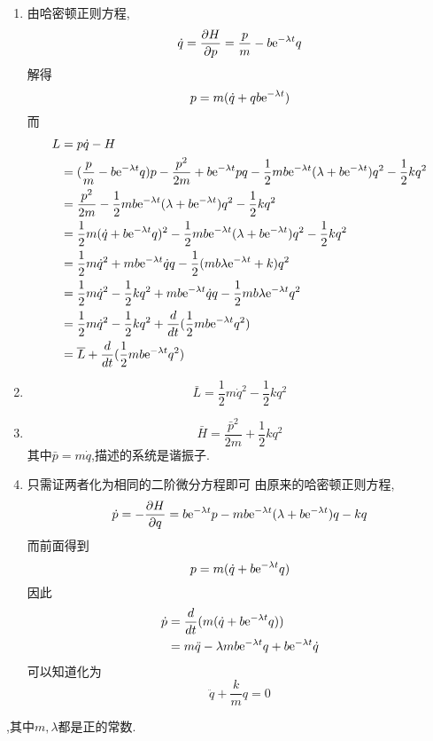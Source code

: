\begin{solution}
    \begin{enumerate}[label=(\arabic*)]
        \item 由哈密顿正则方程,
        $$\dot q=\frac{\partial H}{\partial p}=\frac pm-b\mathrm e^{-\lambda t}q$$
        解得
        $$p=m(\dot q+qb\mathrm e^{-\lambda t})$$
        而
        \begin{align*}
            L&=p\dot q-H\\
             &=(\frac pm-b\mathrm e^{-\lambda t}q)p-\frac{p^2}{2m}+b\mathrm e^{-\lambda t}pq-\frac12mb\mathrm e^{-\lambda t}(\lambda+b\mathrm e^{-\lambda t})q^2-\frac12 kq^2\\
             &=\frac{p^2}{2m}-\frac12mb\mathrm e^{-\lambda t}(\lambda+b\mathrm e^{-\lambda t})q^2-\frac12 kq^2\\
             &=\frac12m(\dot q+b\mathrm e^{-\lambda t}q)^2-\frac12mb\mathrm e^{-\lambda t}(\lambda+b\mathrm e^{-\lambda t})q^2-\frac12 kq^2\\
             &=\frac12m\dot q^2+mb\mathrm e^{-\lambda t}\dot q q-\frac12(mb\lambda\mathrm e^{-\lambda t}+k)q^2\\
             &=\frac12m\dot q^2-\frac12kq^2+mb\mathrm e^{-\lambda t}\dot q q-\frac12mb\lambda\mathrm e^{-\lambda t}q^2\\
             &=\frac12m\dot q^2-\frac12kq^2+\frac{d}{dt}(\frac12 mb\mathrm e^{-\lambda t}q^2)\\
             &=\overline{L}+\frac{d}{dt}(\frac12 mb\mathrm e^{-\lambda t}q^2)
        \end{align*}
    \item $$\bar{L}=\frac12m\dot q^2-\frac12kq^2$$
    \item $$\bar{H}=\frac{\bar{p}^2}{2m}+\frac12kq^2$$
    其中$\bar{p}=m\dot q$,描述的系统是谐振子.
    \item 
    只需证两者化为相同的二阶微分方程即可
    由原来的哈密顿正则方程,
    $$\dot p=-\frac{\partial H}{\partial q}=b\mathrm e^{-\lambda t}p-mb\mathrm e^{-\lambda t}(\lambda+b\mathrm e^{-\lambda t})q-kq$$
    而前面得到
    $$p=m(\dot q+b\mathrm e^{-\lambda t}q)$$
    因此
    \begin{align*}
        \dot p&=\frac{d}{dt}(m(\dot q+b\mathrm e^{-\lambda t}q))\\
              &=m\ddot q-\lambda mb\mathrm e^{-\lambda t}q+b\mathrm e^{-\lambda t}\dot q\\
    \end{align*}
    可以知道化为
    $$\ddot q+\frac km q=0$$
    \end{enumerate}
\end{solution}
,其中$m,\lambda$都是正的常数.

